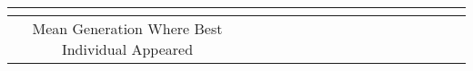 \begin{sidewaystable}[ht]
{\begin{tabular}{|c|c|c|c|c|c|c|c|c|c|c|c|c|c|c|c|}
                        & \multicolumn{1}{|c|}{} & \multicolumn{1}{|c|}{} & \multicolumn{1}{|c|}{} 
			\\ 
 \hline
 \multicolumn{1}{|c|}{\multirow{5}{0.75in}{Mean Generation Where Best Individual Appeared}} 
			& \multicolumn{1}{|c|}{} & \multicolumn{1}{|c|}{} & \multicolumn{1}{|c|}{} 
			& \multicolumn{1}{|c|}{} & \multicolumn{1}{|c|}{} & \multicolumn{1}{|c|}{} 
                        & \multicolumn{1}{|c|}{} & \multicolumn{1}{|c|}{} & \multicolumn{1}{|c|}{} 
			& \multicolumn{1}{|c|}{} & \multicolumn{1}{|c|}{} & \multicolumn{1}{|c|}{} 
                        & \multicolumn{1}{|c|}{} & \multicolumn{1}{|c|}{} & \multicolumn{1}{|c|}{} 
			\\ 
 \multicolumn{1}{|c|}{}
			& \multicolumn{1}{|c|}{} & \multicolumn{1}{|c|}{} & \multicolumn{1}{|c|}{} 
			& \multicolumn{1}{|c|}{} & \multicolumn{1}{|c|}{} & \multicolumn{1}{|c|}{} 
                        & \multicolumn{1}{|c|}{} & \multicolumn{1}{|c|}{} & \multicolumn{1}{|c|}{} 
			& \multicolumn{1}{|c|}{} & \multicolumn{1}{|c|}{} & \multicolumn{1}{|c|}{} 
                        & \multicolumn{1}{|c|}{} & \multicolumn{1}{|c|}{} & \multicolumn{1}{|c|}{} 
			\\ 
 \multicolumn{1}{|c|}{} 
			& \multicolumn{1}{|c|}{} & \multicolumn{1}{|c|}{} & \multicolumn{1}{|c|}{} 
			& \multicolumn{1}{|c|}{} & \multicolumn{1}{|c|}{} & \multicolumn{1}{|c|}{} 
                        & \multicolumn{1}{|c|}{} & \multicolumn{1}{|c|}{} & \multicolumn{1}{|c|}{} 
			& \multicolumn{1}{|c|}{} & \multicolumn{1}{|c|}{} & \multicolumn{1}{|c|}{} 
                        & \multicolumn{1}{|c|}{} & \multicolumn{1}{|c|}{} & \multicolumn{1}{|c|}{} 
			\\ 
 \multicolumn{1}{|c|}{} 
			& \multicolumn{1}{|c|}{} & \multicolumn{1}{|c|}{} & \multicolumn{1}{|c|}{} 
			& \multicolumn{1}{|c|}{} & \multicolumn{1}{|c|}{} & \multicolumn{1}{|c|}{} 
                        & \multicolumn{1}{|c|}{} & \multicolumn{1}{|c|}{} & \multicolumn{1}{|c|}{} 
			& \multicolumn{1}{|c|}{} & \multicolumn{1}{|c|}{} & \multicolumn{1}{|c|}{} 
                        & \multicolumn{1}{|c|}{} & \multicolumn{1}{|c|}{} & \multicolumn{1}{|c|}{} 
			\\ 
 \multicolumn{1}{|c|}{}
			& \multicolumn{1}{|c|}{} & \multicolumn{1}{|c|}{} & \multicolumn{1}{|c|}{} 
			& \multicolumn{1}{|c|}{} & \multicolumn{1}{|c|}{} & \multicolumn{1}{|c|}{} 
                        & \multicolumn{1}{|c|}{} & \multicolumn{1}{|c|}{} & \multicolumn{1}{|c|}{} 
			& \multicolumn{1}{|c|}{} & \multicolumn{1}{|c|}{} & \multicolumn{1}{|c|}{} 
                        & \multicolumn{1}{|c|}{} & \multicolumn{1}{|c|}{} & \multicolumn{1}{|c|}{} 
			\\ 


\end{tabular}}
\end{sidewaystable}
